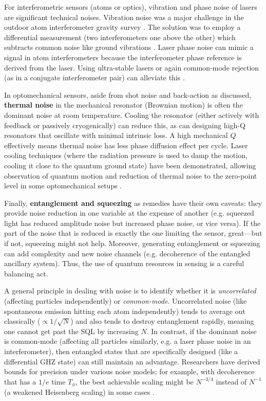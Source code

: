For interferometric sensors (atoms or optics), vibration and phase
noise of lasers are significant technical noises. Vibration noise was
a major challenge in the outdoor atom interferometer gravity survey
. The solution was to employ a differential measurement (two
interferometers one above the other) which subtracts common noise like
ground vibrations . Laser phase noise can mimic a signal in atom
interferometers because the interferometer phase reference is derived
from the laser. Using ultra-stable lasers or again common-mode
rejection (as in a conjugate interferometer pair) can alleviate this .



In optomechanical sensors, aside from shot noise and back-action as
discussed, \textbf{thermal noise} in the mechanical resonator
(Brownian motion) is often the dominant noise at room
temperature. Cooling the resonator (either actively with feedback or
passively cryogenically) can reduce this, as can designing high-Q
resonators that oscillate with minimal intrinsic loss. A high
mechanical $Q$ effectively means thermal noise has less phase
diffusion effect per cycle. Laser cooling techniques (where the
radiation pressure is used to damp the motion, cooling it close to the
quantum ground state) have been demonstrated, allowing observation of
quantum motion and reduction of thermal noise to the zero-point level
in some optomechanical setups .



Finally, \textbf{entanglement and squeezing} as remedies have their
own caveats: they provide noise reduction in one variable at the
expense of another (e.g. squeezed light has reduced amplitude noise
but increased phase noise, or vice versa). If the part of the noise
that is reduced is exactly the one limiting the sensor, great—but if
not, squeezing might not help. Moreover, generating entanglement or
squeezing can add complexity and new noise channels (e.g. decoherence
of the entangled ancillary system). Thus, the use of quantum resources
in sensing is a careful balancing act.



A general principle in dealing with noise is to identify whether it is
\emph{uncorrelated} (affecting particles independently) or
\emph{common-mode}. Uncorrelated noise (like spontaneous emission
hitting each atom independently) tends to average out classically
($\propto 1/\sqrt{N}$) and also tends to destroy entanglement rapidly,
meaning one cannot get past the SQL by increasing $N$. In contrast, if
the dominant noise is common-mode (affecting all particles similarly,
e.g. a laser phase noise in an interferometer), then entangled states
that are specifically designed (like a differential GHZ state) can
still maintain an advantage. Researchers have derived bounds for
precision under various noise models; for example, with decoherence
that has a $1/e$ time $T_{\phi}$, the best achievable scaling might be
$N^{-3/4}$ instead of $N^{-1}$ (a weakened Heisenberg scaling) in some
cases .



